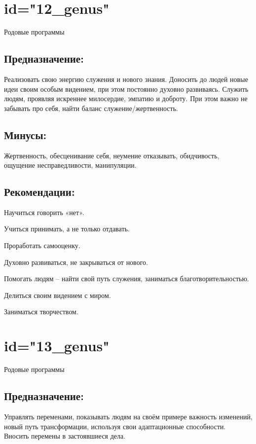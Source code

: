 \endsection

\section{id="12_genus"}{Родовые программы}

\subsection{Предназначение:}
Реализовать свою энергию служения и нового знания. Доносить до 
людей новые идеи своим особым видением, при этом постоянно духовно 
развиваясь. Служить людям, проявляя искреннее милосердие, эмпатию 
и доброту. При этом важно не забывать про себя, найти баланс 
служение/жертвенность.
\endsubsection

\subsection{Минусы:}
Жертвенность, обесценивание себя, неумение отказывать, обидчивость, 
ощущение несправедливости, манипуляции.
\endsubsection

\subsection{Рекомендации:}
\item Научиться говорить «нет».
\item Учиться принимать, а не только отдавать.
\item Проработать самооценку.
\item Духовно развиваться, не закрываться от нового.
\item Помогать людям – найти свой путь служения, заниматься 
благотворительностью.
\item Делиться своим видением с миром.
\item Заниматься творчеством.
\endsubsection

\endsection

\section{id="13_genus"}{Родовые программы}

\subsection{Предназначение:}
Управлять переменами, показывать людям на своём примере важность 
изменений, новый путь трансформации, используя свои адаптационные 
способности. Вносить перемены в застоявшиеся дела.
\endsubsection


